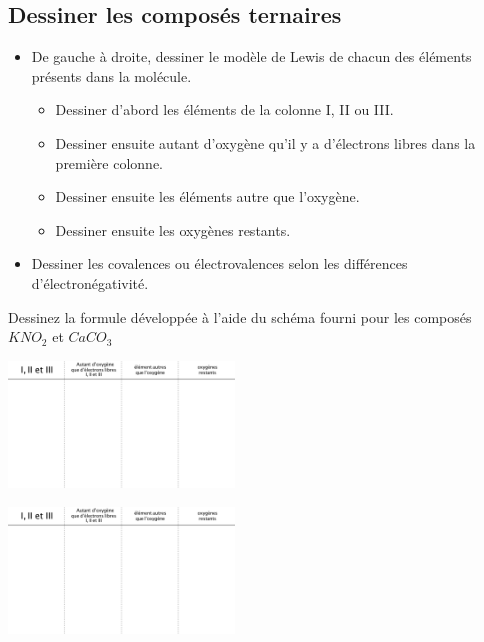 \documentclass[
  11pt,
  french,
  a4paper,
  openany]{book}
\providecommand{\tightlist}{%
  \setlength{\itemsep}{0pt}\setlength{\parskip}{0pt}}
\begin{document}
\hypertarget{dessiner-les-composuxe9s-ternaires}{%
\subsection{Dessiner les composés ternaires}\label{dessiner-les-composuxe9s-ternaires}}

\begin{itemize}
\tightlist
\item
  De gauche à droite, dessiner le modèle de Lewis de chacun des éléments présents dans la molécule.

  \begin{itemize}
  \tightlist
  \item
    Dessiner d'abord les éléments de la colonne I, II ou III.
  \item
    Dessiner ensuite autant d'oxygène qu'il y a d'électrons libres dans la première colonne.
  \item
    Dessiner ensuite les éléments autre que l'oxygène.
  \item
    Dessiner ensuite les oxygènes restants.
  \end{itemize}
\item
  Dessiner les covalences ou électrovalences selon les différences d'électronégativité.
\end{itemize}

\begin{Exercise}

Dessinez la formule développée à l'aide du schéma fourni pour les composés \(KNO_2\) et \(CaCO_3\)

\begin{multicols}{2}
\includegraphics[width=0.45\textwidth,height=\textheight]{exe/formule-developpee.png}

\includegraphics[width=0.45\textwidth,height=\textheight]{exe/formule-developpee.png}

\end{multicols}


\end{Exercise}
\end{document}
